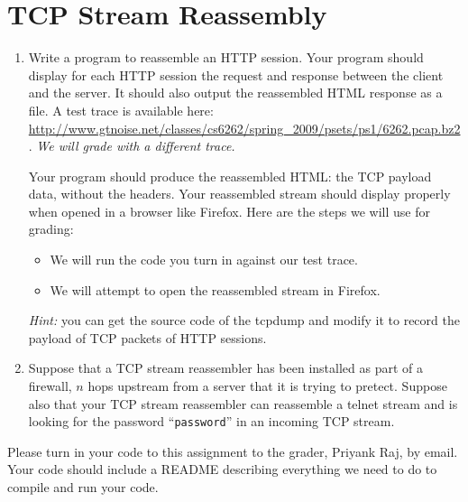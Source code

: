 \documentclass[11pt]{article}
\begin{document}
\begin{enumerate}
\end{enumerate}

\section{TCP Stream Reassembly}

\begin{enumerate}
\item Write a program to reassemble an HTTP session. Your program should
display for each HTTP session the request and response between the
client and the server.  It should also output the reassembled HTML
response as a file.  A test trace is available here: \\
\url{http://www.gtnoise.net/classes/cs6262/spring_2009/psets/ps1/6262.pcap.bz2}.  
{\em We will grade with a different trace.}

Your program should produce the reassembled HTML: the TCP payload data,
without the headers.  Your reassembled stream should display properly
when opened in a browser like Firefox.  Here are the steps we will use
for grading:

\begin{itemize}
\item We will run the code you turn in against our test trace.
\item We will attempt to open the reassembled stream in Firefox.
\end{itemize}

{\em Hint:} you can get the source code of the tcpdump and modify it to
record the payload of TCP packets of HTTP sessions. 

\item Suppose that a TCP stream reassembler has been installed as part
  of a firewall, $n$ hops upstream from a server that it is trying to
  pretect.  Suppose also that your TCP stream reassembler can reassemble
  a telnet stream and is looking for the password ``{\tt password}'' in
  an incoming TCP stream.  

\setcounter{listcount}{0}

\end{enumerate}

Please turn in your code to this assignment to the grader, Priyank Raj,
by email.  Your code should include a README describing everything we
need to do to compile and run your code.
\end{document}

